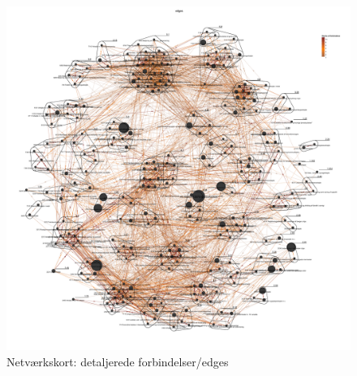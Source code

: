 \begin{figure}[H]
\begin{center}
	\caption{Netværkskort: detaljerede forbindelser/edges}
	\label{appendiks kort edges}
	\includegraphics[width=1.0\textwidth]{fig/netvaerkskort/kort_edges.pdf}
\end{center}
\end{figure}
\restoregeometry




